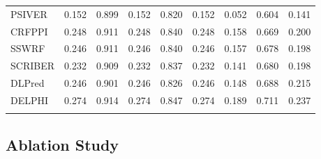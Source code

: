 \begin{table}
\begin{tabular}{@{}l@{\ }*{8}{r}}
    PSIVER & \cellcolor[rgb]{ .988,  .988,  1}0.152 & \cellcolor[rgb]{ .937,  .953,  .937}0.899 & \cellcolor[rgb]{ .988,  .988,  1}0.152 & \cellcolor[rgb]{ .988,  .988,  1}0.820 & \cellcolor[rgb]{ .988,  .988,  1}0.152 & \cellcolor[rgb]{ .988,  .988,  1}0.052 & \cellcolor[rgb]{ .706,  .784,  .659}0.604 & \cellcolor[rgb]{ .941,  .957,  .945}0.141 \\
    CRFPPI & \cellcolor[rgb]{ .475,  .616,  .384}0.248 & \cellcolor[rgb]{ .478,  .62,  .388}0.911 & \cellcolor[rgb]{ .475,  .616,  .384}0.248 & \cellcolor[rgb]{ .49,  .627,  .4}0.840 & \cellcolor[rgb]{ .475,  .616,  .384}0.248 & \cellcolor[rgb]{ .478,  .616,  .384}0.158 & \cellcolor[rgb]{ .475,  .616,  .384}0.669 & \cellcolor[rgb]{ .565,  .682,  .49}0.200 \\
    SSWRF & \cellcolor[rgb]{ .482,  .624,  .392}0.246 & \cellcolor[rgb]{ .486,  .624,  .396}0.911 & \cellcolor[rgb]{ .482,  .624,  .392}0.246 & \cellcolor[rgb]{ .498,  .635,  .412}0.840 & \cellcolor[rgb]{ .482,  .624,  .392}0.246 & \cellcolor[rgb]{ .486,  .624,  .396}0.157 & \cellcolor[rgb]{ .447,  .596,  .349}0.678 & \cellcolor[rgb]{ .576,  .69,  .506}0.198 \\
    SCRIBER & \cellcolor[rgb]{ .557,  .675,  .482}0.232 & \cellcolor[rgb]{ .553,  .671,  .475}0.909 & \cellcolor[rgb]{ .557,  .675,  .482}0.232 & \cellcolor[rgb]{ .569,  .686,  .498}0.837 & \cellcolor[rgb]{ .557,  .675,  .482}0.232 & \cellcolor[rgb]{ .557,  .678,  .482}0.141 & \cellcolor[rgb]{ .439,  .592,  .341}0.680 & \cellcolor[rgb]{ .576,  .69,  .506}0.198 \\
    DLPred & \cellcolor[rgb]{ .482,  .62,  .392}0.246 & \cellcolor[rgb]{ .859,  .894,  .843}0.901 & \cellcolor[rgb]{ .482,  .62,  .388}0.246 & \cellcolor[rgb]{ .855,  .894,  .839}0.826 & \cellcolor[rgb]{ .482,  .62,  .388}0.246 & \cellcolor[rgb]{ .529,  .655,  .447}0.148 & \cellcolor[rgb]{ .412,  .569,  .306}0.688 & \cellcolor[rgb]{ .467,  .612,  .373}0.215 \\
    DELPHI & \cellcolor[rgb]{ .329,  .51,  .208}0.274 & \cellcolor[rgb]{ .329,  .51,  .208}0.914 & \cellcolor[rgb]{ .329,  .51,  .208}0.274 & \cellcolor[rgb]{ .329,  .51,  .208}0.847 & \cellcolor[rgb]{ .329,  .51,  .208}0.274 & \cellcolor[rgb]{ .329,  .51,  .208}0.189 & \cellcolor[rgb]{ .329,  .51,  .208}0.711 & \cellcolor[rgb]{ .329,  .51,  .208}0.237 \\
\label{tab_ds186_164_72}
    \end{tabular}%
\end{table}%

\subsection{Ablation Study}
